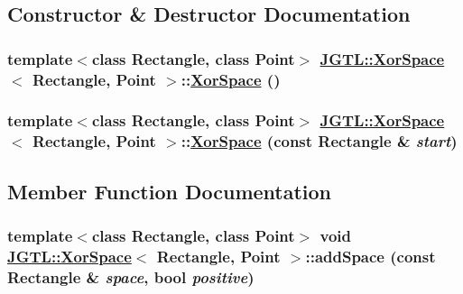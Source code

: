 \subsection{Constructor \& Destructor Documentation}
\hypertarget{class_j_g_t_l_1_1_xor_space_ad236c36d98b3fbf0d592ea1a524c34d}{
\subsubsection[XorSpace]{\setlength{\rightskip}{0pt plus 5cm}template$<$class Rectangle, class Point$>$ \hyperlink{class_j_g_t_l_1_1_xor_space}{JGTL::Xor\-Space}$<$ Rectangle, Point $>$::\hyperlink{class_j_g_t_l_1_1_xor_space}{Xor\-Space} ()}}
\label{class_j_g_t_l_1_1_xor_space_ad236c36d98b3fbf0d592ea1a524c34d}


\hypertarget{class_j_g_t_l_1_1_xor_space_7ba86691f975e9e55e71ff94e46b7855}{
\subsubsection[XorSpace]{\setlength{\rightskip}{0pt plus 5cm}template$<$class Rectangle, class Point$>$ \hyperlink{class_j_g_t_l_1_1_xor_space}{JGTL::Xor\-Space}$<$ Rectangle, Point $>$::\hyperlink{class_j_g_t_l_1_1_xor_space}{Xor\-Space} (const Rectangle \& {\em start})}}
\label{class_j_g_t_l_1_1_xor_space_7ba86691f975e9e55e71ff94e46b7855}




\subsection{Member Function Documentation}
\hypertarget{class_j_g_t_l_1_1_xor_space_0f5b4faaaf03b9c7f85302125e2e834b}{
\subsubsection[addSpace]{\setlength{\rightskip}{0pt plus 5cm}template$<$class Rectangle, class Point$>$ void \hyperlink{class_j_g_t_l_1_1_xor_space}{JGTL::Xor\-Space}$<$ Rectangle, Point $>$::add\-Space (const Rectangle \& {\em space}, bool {\em positive})}}
\label{class_j_g_t_l_1_1_xor_space_0f5b4faaaf03b9c7f85302125e2e834b}


